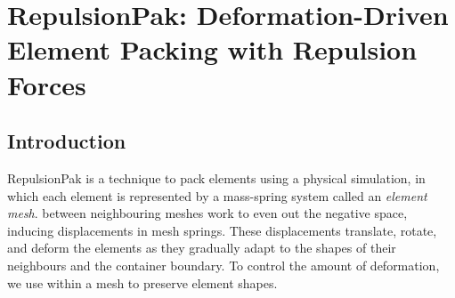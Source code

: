 
\newcommand{\simforce}[1]{\bm{F}_\mathrm{#1}}

\chapter[RepulsionPak: Deformation-Driven Element Packing \newline with Repulsion Forces]
{RepulsionPak: Deformation-Driven Element Packing with Repulsion Forces}
\label{chapter_repulsionpak}


\section{Introduction}
\label{repulsionpak_introduction}


\newtext
{
RepulsionPak is a technique
to pack elements using a physical simulation, 
in which each element is represented
by a mass-spring system called an \textit{element mesh}.  
 between neighbouring meshes work to even out the negative
space, inducing displacements in mesh springs.
These displacements translate, rotate, and deform the elements as 
they gradually adapt to the shapes of their neighbours
and the container boundary.  
To control the amount of deformation,
we use  within a mesh to preserve element shapes.}



